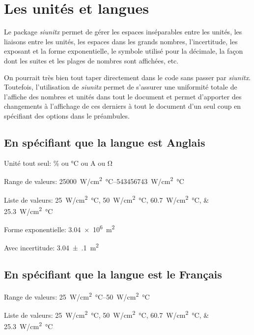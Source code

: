 \documentclass[exemple_master.tex]{subfiles}
\begin{document}
\section{Les unités et langues}

Le package \emph{siunitx} permet de gérer les espaces inséparables entre les unités, les liaisons entre les unités, les espaces dans les grands nombres, l'incertitude, les exposant et la forme exponentielle, le symbole utilisé pour la décimale, la façon dont les suites et les plages de nombres sont affichées, etc.

On pourrait très bien tout taper directement dans le code sans passer par \emph{siunitx}. Toutefois, l'utilisation de \emph{siunitx} permet de s'assurer une uniformité totale de l'affiche des nombres et unités dans tout le document et permet d'apporter des changements à l'affichage de ces derniers à tout le document d'un seul coup en spécifiant des options dans le préambules.

\subsection{En spécifiant que la langue est Anglais}

Unité tout seul: \si{\percent} ou \si{\celsius} ou \si{\ampere} ou \si{\ohm}

Range de valeurs: \SIrange{25000}{543456743}{W/cm^2 \celsius}

Liste de valeurs: \SIlist{25;50;60.7;25.3}{W/cm^2 \celsius}

Forme exponentielle: \SI{3.04e6}{m^2}

Avec incertitude: \SI{3.04(10)}{m^2}

\subsection{En spécifiant que la langue est le Français}

Range de valeurs: \SIrange{25}{50}{W/cm^2 \celsius}

Liste de valeurs: \SIlist{25;50;60.7;25.3}{W/cm^2 \celsius}
\end{document}
